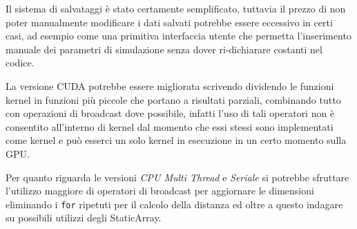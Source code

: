 \documentclass[11pt, a4paper]{article}
\begin{document}
Il sistema di salvataggi è stato certamente semplificato, tuttavia il prezzo di non poter manualmente modificare i dati salvati potrebbe essere eccessivo in certi casi, ad esempio come una primitiva interfaccia utente che permetta l'inserimento manuale dei parametri di simulazione senza dover ri-dichiarare costanti nel codice.

La versione CUDA potrebbe essere migliorata scrivendo dividendo le funzioni kernel in funzioni più piccole che portano a risultati parziali, combinando tutto con operazioni di broadcast dove possibile, infatti l'uso di tali operatori non è consentito all'interno di kernel dal momento che essi stessi sono implementati come kernel e può esserci un solo kernel in esecuzione in un certo momento sulla GPU.

Per quanto riguarda le versioni \emph{CPU Multi Thread} e \emph{Seriale} si potrebbe sfruttare l'utilizzo maggiore di operatori di broadcast per aggiornare le dimensioni eliminando i \texttt{for} ripetuti per il calcolo della distanza  ed oltre a questo indagare su possibili utilizzi degli StaticArray.



\printbibliography
\end{document}

